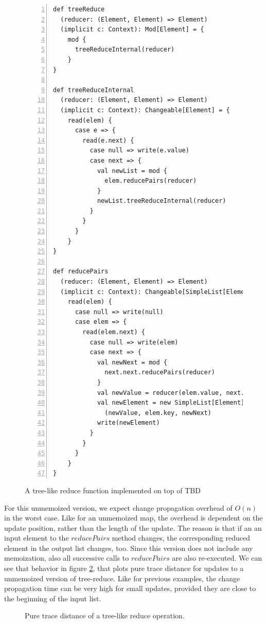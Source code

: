 \begin{figure}
\begin{lstlisting}[frame=single,basicstyle=\ttfamily,numbers=left,mathescape=true]
def treeReduce
  (reducer: (Element, Element) => Element)
  (implicit c: Context): Mod[Element] = {
    mod {
      treeReduceInternal(reducer)
    }
}

def treeReduceInternal
  (reducer: (Element, Element) => Element)
  (implicit c: Context): Changeable[Element] = {
    read(elem) {
      case e => {
        read(e.next) {
          case null => write(e.value)
          case next => {
            val newList = mod {
              elem.reducePairs(reducer)
            }
            newList.treeReduceInternal(reducer)
          }
        }
      }
    }
}

def reducePairs
  (reducer: (Element, Element) => Element)
  (implicit c: Context): Changeable[SimpleList[Element]] = {
    read(elem) {
      case null => write(null)
      case elem => {
        read(elem.next) {
          case null => write(elem)
          case next => {
            val newNext = mod {
              next.next.reducePairs(reducer)
            }
            val newValue = reducer(elem.value, next.value)
            val newElement = new SimpleList[Element]
              (newValue, elem.key, newNext)
            write(newElement)
          }
        }
      }
    }
}

\end{lstlisting}
\caption{A tree-like reduce function implemented on top of TBD}
\label{code:tree_reduce}
\end{figure}

For this unmemoized version, we expect change propagation overhead of $O(n)$ in the worst case. Like for an unmemoized map, the overhead is dependent on the update position, rather than the length of the update. The reason is that if an an input element to the $reducePairs$ method changes, the corresponding reduced element in the output list changes, too. Since this version does not include any memoization, also all successive calls to $reducePairs$ are also re-executed. We can see that behavior in figure \ref{plot:tree_reduce_pure}, that plots pure trace distance for updates to a unmemoized version of tree-reduce. Like for previous examples, the change propagation time can be very high for small updates, provided they are close to the beginning of the input list. 

\begin{figure}
\centering
{}
\caption{Pure trace distance of a tree-like reduce operation.}
\label{plot:tree_reduce_pure}
\end{figure}

